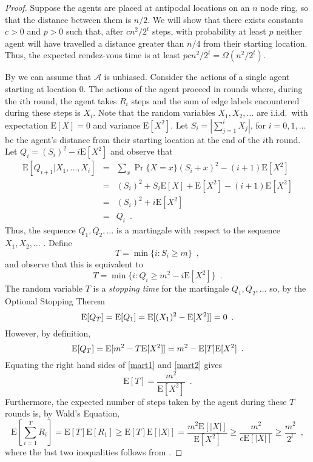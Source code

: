 \documentclass[lotsofwhite]{patmorin}
\newcommand{\E}{\mathrm{E}}
\newcommand{\A}{\mathcal{A}}
\begin{document}
\begin{proof}
Suppose the agents are placed at antipodal locations on an $n$ node ring,
so that the distance between them is $n/2$.  We will show that there
exists constants $c >0$ and $p> 0$ such that, after $cn^2/2^t$ steps,
with probability at least $p$ neither agent will have travelled a
distance greater than $n/4$ from their starting location.  Thus, the
expected rendez-vous time is at least $p cn^2/2^t = \Omega(n^2/2^t)$.

By  we can assume that $\A$ is unbiased.
Consider the actions of a single agent starting at location 0.  The
actions of the agent proceed in rounds where, during the $i$th round,
the agent takes $R_i$ steps and the sum of edge labels encountered
during these steps is $X_i$.  Note that the random variables
$X_1,X_2,\ldots$ are i.i.d.\ with expectation $\E[X]=0$ and variance
$\E[X^2]$.  Let $S_i=\left|\sum_{j=1}^i X_j\right|$, for
$i=0,1,\ldots$ be the agent's
distance from their starting location at the end of the $i$th round.
Let $Q_i= (S_i)^2 - i\E[X^2]$ and observe that 
\begin{eqnarray*}
 \E\left[Q_{i+1}|X_1,\ldots,X_i\right]
 & = & \sum_{x} \Pr\{X=x\}\left(S_i + x\right)^2 - (i+1)\E[X^2] \\
 & = & (S_i)^2 + S_i\E[X] + \E[X^2] - (i+1)\E[X^2] \\
 & = & (S_i)^2 + i\E[X^2] \\
 & = & Q_i  \enspace .
\end{eqnarray*}
Thus, the sequence $Q_1,Q_2,\ldots$ is a martingale with respect to
the sequence $X_1,X_2,\ldots$ \cite{ross}.  Define
\[
    T = \min\{i : S_i \ge m \} \enspace ,
\]
and observe that this is equivalent to 
\[
    T = \min\{i : Q_i \ge m^2 - i\E[X^2] \} \enspace .
\]
The random variable $T$ is a \emph{stopping time} for the martingale
$Q_1,Q_2,\ldots$ so, by the Optional Stopping Therem \cite{ross}
\begin{equation}
  \E[Q_T] 
    = \E[Q_1] 
    = \E[(X_1)^2 - \E[X^2]] = 0 \enspace . \eqlabel{mart1}
\end{equation}
However, by definition, 
\begin{equation}
  \E[Q_T] 
    = \E[m^2 - T\E[X^2]] 
    = m^2 - \E[T]\E[X^2] \enspace . \eqlabel{mart2}
\end{equation}
Equating the right hand sides of \eqref{mart1} and \eqref{mart2} gives 
\[
   \E[T] = \frac{m^2}{\E[X^2]} \enspace .
\]
Furthermore, the expected number of steps taken by the agent during
these $T$ rounds is, by Wald's Equation, 
\[
  \E\left[\sum_{i=1}^T R_i\right] 
    =  \E[T]\E[R_1] 
   \ge \E[T]\E[|X|] 
    =  \frac{m^2 \E[|X|]}{\E[X^2]} 
   \ge \frac{m^2}{c\E[|X|]} 
   \ge \frac{m^2}{2^t} 
   \enspace ,
\] 
where the last two inequalities follows from .
\end{proof}
\end{document}
